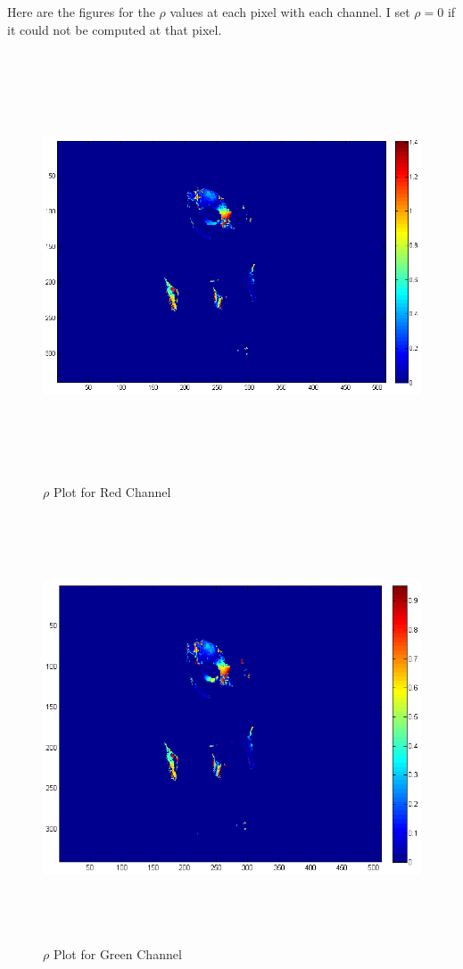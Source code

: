 \documentclass[11pt,psfig]{article}
\begin{document}
\newpage
Here are the figures for the $\rho$ values at each pixel with each channel. I set $\rho=0$ if it could not be computed at that pixel.
\begin{figure}[H]
\centering
\includegraphics[height=5in]{prob4rhoPlot1.png}
\caption{$\rho$ Plot for Red Channel}
\end{figure}
\begin{figure}[H]
\centering
\includegraphics[height=5in]{prob4rhoPlot2.png}
\caption{$\rho$ Plot for Green Channel}
\end{figure}
\end{document}
